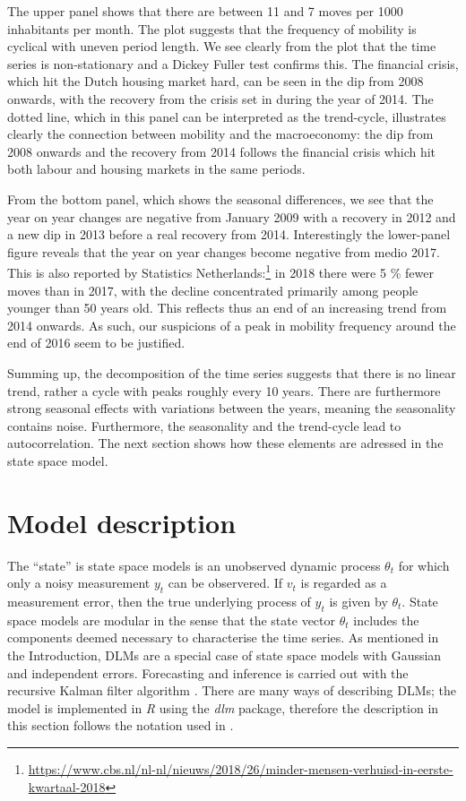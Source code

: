 \documentclass[12pt, a4paper]{article}
\begin{document}
The upper panel shows that there are between 11 and 7 moves per 1000
inhabitants per month. The plot suggests that the frequency of mobility
is cyclical with uneven period length. We see clearly from the plot that
the time series is non-stationary and a Dickey Fuller test confirms
this. The financial crisis, which hit the Dutch housing market hard, can
be seen in the dip from 2008 onwards, with the recovery from the crisis
set in during the year of 2014. The dotted line, which in this panel can
be interpreted as the trend-cycle, illustrates clearly the connection
between mobility and the macroeconomy: the dip from 2008 onwards and the
recovery from 2014 follows the financial crisis which hit both labour
and housing markets in the same periods.

From the bottom panel, which shows the seasonal differences, we see that
the year on year changes are negative from January 2009 with a recovery
in 2012 and a new dip in 2013 before a real recovery from 2014.
Interestingly the lower-panel figure reveals that the year on year
changes become negative from medio 2017. This is also reported by
Statistics
Netherlands:\footnote{\url{https://www.cbs.nl/nl-nl/nieuws/2018/26/minder-mensen-verhuisd-in-eerste-kwartaal-2018}}
in 2018 there were 5 \% fewer moves than in 2017, with the decline
concentrated primarily among people younger than 50 years old. This
reflects thus an end of an increasing trend from 2014 onwards. As such,
our suspicions of a peak in mobility frequency around the end of
2016 seem to be justified.

Summing up, the decomposition of the time series suggests that there is
no linear trend, rather a cycle with peaks roughly every 10 years. There
are furthermore strong seasonal effects with variations between the
years, meaning the seasonality contains noise. Furthermore, the
seasonality and the trend-cycle lead to autocorrelation. The next
section shows how these elements are adressed in the state space model.

\section{Model description}\label{model-description}

The ``state'' is state space models is an unobserved dynamic process
$\theta_{t}$ for which only a noisy measurement $y_{t}$ can be
observered. If $v_{t}$ is regarded as a measurement error, then the true underlying process of $y_{t}$ is given by $\theta_{t}$. State space models are modular in the sense that the state vector $\theta_{t}$ includes the components deemed
necessary to characterise the time series. As mentioned in the
Introduction, DLMs are a special case of state space models with
Gaussian and independent errors. Forecasting and inference is carried
out with the recursive Kalman filter algorithm
\citep{kalman1960contributions}. There are many ways of describing DLMs; the model
is implemented in \emph{R} using the \emph{dlm} package, therefore the
description in this section follows the notation used in
\citet{petris2009dynamic}.
\end{document}
